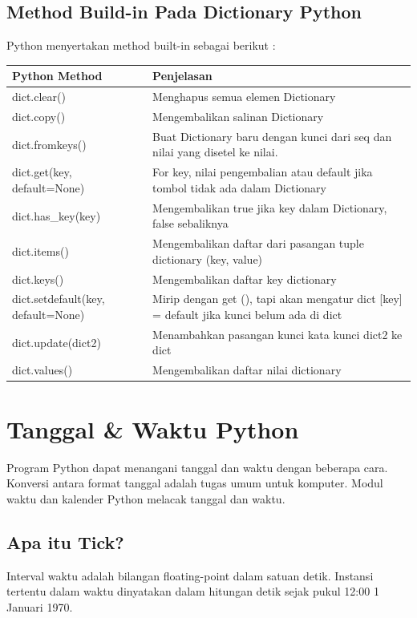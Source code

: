 \subsection{Method Build-in Pada Dictionary Python}
Python menyertakan method built-in sebagai berikut :
\begin{center}
\begin{tabular}{ | m{4cm} | m{4cm} | }
\hline
Python Method & Penjelasan \\
\hline
dict.clear() & Menghapus semua elemen Dictionary \\
\hline
dict.copy() & Mengembalikan salinan Dictionary \\
\hline
dict.fromkeys() & Buat Dictionary baru dengan kunci dari seq dan nilai yang disetel ke nilai. \\
\hline
dict.get(key, default=None) & For key, nilai pengembalian atau default jika tombol tidak ada dalam Dictionary \\
\hline
dict.has\_key(key) & Mengembalikan true jika key dalam Dictionary, false sebaliknya \\
\hline
dict.items() & Mengembalikan daftar dari pasangan tuple dictionary (key, value) \\
\hline
dict.keys() & Mengembalikan daftar key dictionary \\
\hline
dict.setdefault(key, default=None) & Mirip dengan get (), tapi akan mengatur dict [key] = default jika kunci belum ada di dict \\
\hline
dict.update(dict2) & Menambahkan pasangan kunci kata kunci dict2 ke dict \\
\hline
dict.values() & Mengembalikan daftar nilai dictionary \\
\hline
\end{tabular}
\end{center}


\section{Tanggal \& Waktu Python}
Program Python dapat menangani tanggal dan waktu dengan beberapa cara. Konversi antara format tanggal adalah tugas umum untuk komputer. Modul waktu dan kalender Python melacak tanggal dan waktu.

\subsection{Apa itu Tick?}
Interval waktu adalah bilangan floating-point dalam satuan detik. Instansi tertentu dalam waktu dinyatakan dalam hitungan detik sejak pukul 12:00 1 Januari 1970.

